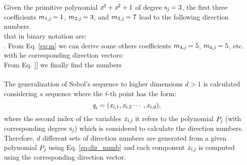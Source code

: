Given the primitive polynomial $\textit{x}^3+\textit{x}^2+1$ of degree $\textrm{s}_{\textit{j}}=3$, the first three coefficients $m_{1, \textit{j}}=1$, 
$m_{2, \textit{j}}=3$, and $m_{3, \textit{j}}=7$ lead to the following direction numbers 
\begin{equation}
\end{equation}
that in binary notation are:
\begin{equation}
\end{equation}.
From Eq. \ref{eq:m} we can derive some others coefficients $m_{4,\textit{j}}=5$, $m_{4,\textit{j}}=5$, etc. with he corresponding direction vectors:
\begin{equation}
\end{equation}
From Eq. \ref{} we finally find the numbers
\begin{equation}
\end{equation}
\\ \indent
The generalization of Sobol's sequence to higher dimensions $d>1$ is calculated considering a sequence where the $\textit{i}$-th point has the form:
\begin{equation}
\textit{q}_{i} = (\textit{x}_{\textit{i}, 1},\textit{x}_{\textit{i}, 2} \cdots, \textit{x}_{\textit{i}, d}),
\end{equation}
where the second index of the variables $\textit{x}_{\textit{i}, \textit{j}}$ it refers to the polynomial $P_{\textit{j}}$ (with corresponding degree $\textrm{s}_{\textit{j}}$) which is considered to calculate the direction numbers. Therefore, $d$ different sets of direction numbers are generated from a given polynomial $P_{\textit{j}}$ using Eq. \ref{eq:dir_numb} and each component $\textit{x}_{\textit{i},\textit{j}}$ is computed using the corresponding direction vector. 